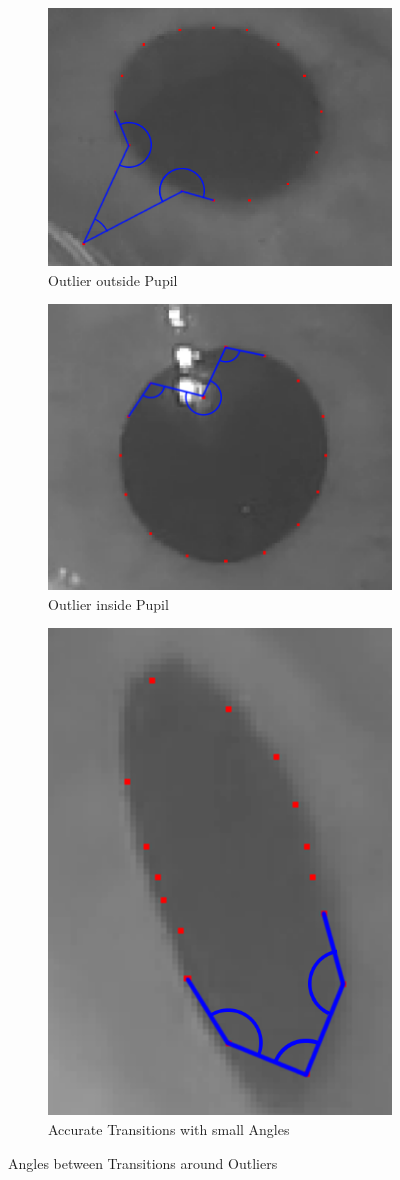 \begin{figure}[H]
\begin{subfigure}{.33\textwidth}
	\centering
	\includegraphics[width=.6\linewidth]{images/angle.png}
	\caption{Outlier outside Pupil}
	\label{fig:outlierOutside}
\end{subfigure}%
\begin{subfigure}{.33\textwidth}
	\centering
	\includegraphics[width=.6\linewidth]{images/outlier_inner.png}
	\caption{Outlier inside Pupil}
	\label{fig:outlierInside}
\end{subfigure}
\begin{subfigure}{.33\textwidth}
	\centering
	\includegraphics[width=.4\linewidth]{images/non_outlier.png}
	\caption{Accurate Transitions  with small Angles}
	\label{fig:nonOutlier}
\end{subfigure}
\caption{Angles between Transitions around Outliers}
\end{figure}

